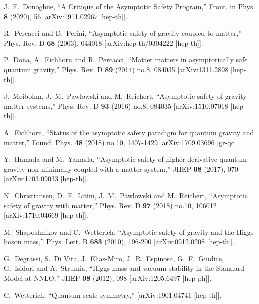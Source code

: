 \documentclass[12pt]{article}
\numberwithin{equation}{section}
\begin{document}
\begin{thebibliography}{999}
J.~F.~Donoghue,
``A Critique of the Asymptotic Safety Program,''
Front. in Phys. \textbf{8} (2020), 56
[arXiv:1911.02967 [hep-th]].

R.~Percacci and D.~Perini,
``Asymptotic safety of gravity coupled to matter,''
Phys. Rev. D \textbf{68} (2003), 044018
[arXiv:hep-th/0304222 [hep-th]].

P.~Dona, A.~Eichhorn and R.~Percacci,
``Matter matters in asymptotically safe quantum gravity,''
Phys. Rev. D \textbf{89} (2014) no.8, 084035
[arXiv:1311.2898 [hep-th]].

J.~Meibohm, J.~M.~Pawlowski and M.~Reichert,
``Asymptotic safety of gravity-matter systems,''
Phys. Rev. D \textbf{93} (2016) no.8, 084035
[arXiv:1510.07018 [hep-th]].

A.~Eichhorn,
``Status of the asymptotic safety paradigm for quantum gravity and matter,''
Found. Phys. \textbf{48} (2018) no.10, 1407-1429
[arXiv:1709.03696 [gr-qc]].

Y.~Hamada and M.~Yamada,
``Asymptotic safety of higher derivative quantum gravity non-minimally coupled with a matter system,''
JHEP \textbf{08} (2017), 070
[arXiv:1703.09033 [hep-th]].

N.~Christiansen, D.~F.~Litim, J.~M.~Pawlowski and M.~Reichert,
``Asymptotic safety of gravity with matter,''
Phys. Rev. D \textbf{97} (2018) no.10, 106012
[arXiv:1710.04669 [hep-th]].

M.~Shaposhnikov and C.~Wetterich,
``Asymptotic safety of gravity and the Higgs boson mass,''
Phys. Lett. B \textbf{683} (2010), 196-200
[arXiv:0912.0208 [hep-th]].

G.~Degrassi, S.~Di Vita, J.~Elias-Miro, J.~R.~Espinosa, G.~F.~Giudice, G.~Isidori and A.~Strumia,
``Higgs mass and vacuum stability in the Standard Model at NNLO,''
JHEP \textbf{08} (2012), 098
[arXiv:1205.6497 [hep-ph]].

C.~Wetterich, ``Quantum scale symmetry,''
[arXiv:1901.04741 [hep-th]].

\end{thebibliography}

\end{document}
